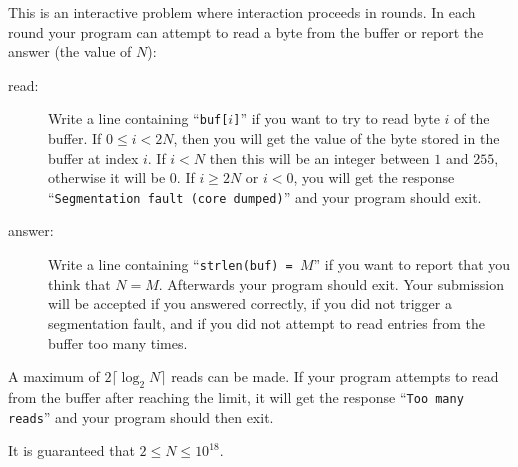 

This is an interactive problem where interaction proceeds in rounds.
In each round your program can attempt to read a byte from the buffer or report
the answer (the value of $N$):

\begin{description}
\item[read:]
  Write a line containing ``\texttt{buf[$i$]}'' if you want to try to read byte
  $i$ of the buffer. If $0 \leq i < 2N$, then you will get the value of the byte
  stored in the buffer at index $i$. If $i < N$ then this will be an integer
  between $1$ and $255$, otherwise it will be $0$. If $i \geq 2 N$ or $i < 0$,
  you will get the response ``\texttt{Segmentation fault (core dumped)}'' and
  your program should exit.
\item[answer:]
  Write a line containing ``\texttt{strlen(buf) = $M$}'' if you want to report
  that you think that $N = M$. Afterwards your program should exit.
  Your submission will be accepted if you answered correctly, if you did not
  trigger a segmentation fault, and if you did not attempt to read entries from
  the buffer too many times.
\end{description}

\noindent
A maximum of $2 \lceil{\log_2 N\rceil}$ reads can be made.
If your program attempts to read from the buffer after reaching the limit, it
will get the response ``\texttt{Too many reads}'' and your program should then
exit.

\medskip

\noindent
It is guaranteed that $2 \leq N \leq 10^{18}$.
